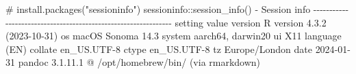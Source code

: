 \documentclass[
  10pt,
  a4paper,
]{book}
\newenvironment{Shaded}{\begin{snugshade}}{\end{snugshade}}
\newcommand{\CommentTok}[1]{\textcolor[rgb]{0.37,0.37,0.37}{#1}}
\newcommand{\DecValTok}[1]{\textcolor[rgb]{0.68,0.00,0.00}{#1}}
\newcommand{\ErrorTok}[1]{\textcolor[rgb]{0.68,0.00,0.00}{#1}}
\newcommand{\FloatTok}[1]{\textcolor[rgb]{0.68,0.00,0.00}{#1}}
\newcommand{\FunctionTok}[1]{\textcolor[rgb]{0.28,0.35,0.67}{#1}}
\newcommand{\NormalTok}[1]{\textcolor[rgb]{0.00,0.46,0.62}{#1}}
\newcommand{\SpecialCharTok}[1]{\textcolor[rgb]{0.37,0.37,0.37}{#1}}
\begin{document}
\begin{Shaded}
\begin{Highlighting}[]
\CommentTok{\# install.packages("sessioninfo")}
\NormalTok{sessioninfo}\SpecialCharTok{::}\FunctionTok{session\_info}\NormalTok{()}
\SpecialCharTok{{-}}\NormalTok{ Session info }\SpecialCharTok{{-}{-}{-}{-}{-}{-}{-}{-}{-}{-}{-}{-}{-}{-}{-}{-}{-}{-}{-}{-}{-}{-}{-}{-}{-}{-}{-}{-}{-}{-}{-}{-}{-}{-}{-}{-}{-}{-}{-}{-}{-}{-}{-}{-}{-}{-}{-}{-}{-}{-}{-}{-}{-}{-}{-}{-}{-}{-}{-}{-}{-}{-}{-}}
\NormalTok{ setting  value}
\NormalTok{ version  R version }\DecValTok{4}\NormalTok{.}\FloatTok{3.2}\NormalTok{ (}\DecValTok{2023{-}10{-}31}\NormalTok{)}
\NormalTok{ os       macOS Sonoma }\FloatTok{14.3}
\NormalTok{ system   aarch64, darwin20}
\NormalTok{ ui       X11}
 \FunctionTok{language}\NormalTok{ (EN)}
\NormalTok{ collate  en\_US.UTF}\DecValTok{{-}8}
\NormalTok{ ctype    en\_US.UTF}\DecValTok{{-}8}
\NormalTok{ tz       Europe}\SpecialCharTok{/}\NormalTok{London}
\NormalTok{ date     }\DecValTok{2024{-}01{-}31}
\NormalTok{ pandoc   }\DecValTok{3}\NormalTok{.}\DecValTok{1}\NormalTok{.}\FloatTok{11.1} \SpecialCharTok{@} \ErrorTok{/}\NormalTok{opt}\SpecialCharTok{/}\NormalTok{homebrew}\SpecialCharTok{/}\NormalTok{bin}\SpecialCharTok{/}\NormalTok{ (via rmarkdown)}


\end{Highlighting}
\end{Shaded}
\end{document}
